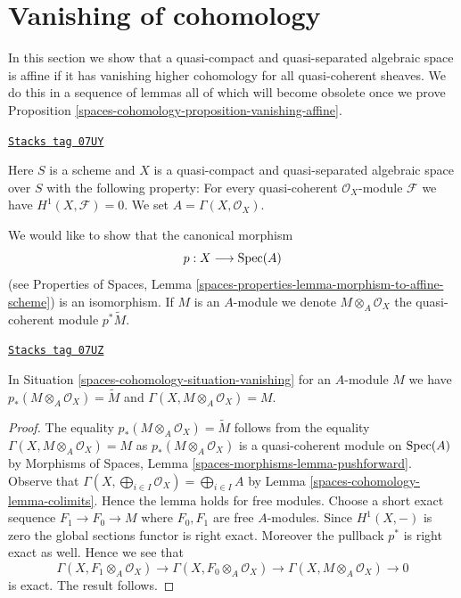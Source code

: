 \section{Vanishing of cohomology}
\label{spaces-cohomology-section-vanishing}
In this section we show that a quasi-compact and quasi-separated
algebraic space is affine if it has vanishing higher cohomology
for all quasi-coherent sheaves. We do this in a sequence of lemmas
all of which will become obsolete once we prove
Proposition \ref{spaces-cohomology-proposition-vanishing-affine}.

\begin{definition}
\label{spaces-cohomology-situation-vanishing}
\href{https://stacks.math.columbia.edu/tag/07UY}{\texttt{Stacks tag 07UY}}

Here $S$ is a scheme and $X$ is a quasi-compact and quasi-separated
algebraic space over $S$ with the following property: For every
quasi-coherent $\mathcal{O}_X$-module $\mathcal{F}$ we have
$H^1(X, \mathcal{F}) = 0$. We set $A = \Gamma(X, \mathcal{O}_X)$.
\end{definition}

We would like to show that the canonical morphism
$$
p : X \longrightarrow \operatorname{Spec}(A)
$$
(see Properties of Spaces, Lemma
\ref{spaces-properties-lemma-morphism-to-affine-scheme}) is an isomorphism.
If $M$ is an $A$-module we denote $M \otimes_A \mathcal{O}_X$
the quasi-coherent module $p^*\tilde M$.

\begin{lemma}
\label{spaces-cohomology-lemma-vanishing-compute}
\href{https://stacks.math.columbia.edu/tag/07UZ}{\texttt{Stacks tag 07UZ}}

In Situation \ref{spaces-cohomology-situation-vanishing} for an $A$-module $M$ we have
$p_*(M \otimes_A \mathcal{O}_X) = \widetilde{M}$ and
$\Gamma(X, M \otimes_A \mathcal{O}_X) = M$.
\end{lemma}

\begin{proof}
The equality $p_*(M \otimes_A \mathcal{O}_X) = \widetilde{M}$ follows
from the equality $\Gamma(X, M \otimes_A \mathcal{O}_X) = M$ as
$p_*(M \otimes_A \mathcal{O}_X)$ is a quasi-coherent module on
$\operatorname{Spec}(A)$ by Morphisms of Spaces, Lemma
\ref{spaces-morphisms-lemma-pushforward}.
Observe that $\Gamma(X, \bigoplus_{i \in I} \mathcal{O}_X) =
\bigoplus_{i \in I} A$ by Lemma \ref{spaces-cohomology-lemma-colimits}. Hence the
lemma holds for free modules. Choose a short exact sequence
$F_1 \to F_0 \to M$ where $F_0, F_1$ are free $A$-modules. Since
$H^1(X, -)$ is zero the global sections functor is right exact.
Moreover the pullback $p^*$ is right exact as well. Hence we see
that
$$
\Gamma(X, F_1 \otimes_A \mathcal{O}_X) \to
\Gamma(X, F_0 \otimes_A \mathcal{O}_X) \to
\Gamma(X, M \otimes_A \mathcal{O}_X) \to 0
$$
is exact. The result follows.
\end{proof}

